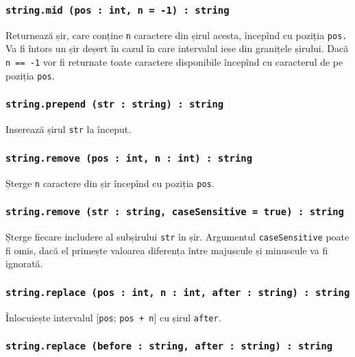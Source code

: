 \subsubsection{\texttt{string.mid (pos : int, n = -1) : string}}

Returnează șir, care conține \texttt{n} caractere din șirul acesta, începînd cu poziția \texttt{pos.} Va fi întors un șir deșert în cazul în care intervalul iese din granițele șirului. Dacă \texttt{n == -1} vor fi returnate toate caractere disponibile începînd cu caracterul de pe poziția \texttt{pos}.

\subsubsection{\texttt{string.prepend (str : string) : string}}

Inserează șirul \texttt{str} la început.

\subsubsection{\texttt{string.remove (pos : int, n : int) : string}}

Șterge \texttt{n} caractere din șir începînd cu poziția \texttt{pos}.

\subsubsection{\texttt{string.remove (str : string, caseSensitive = true) : string}}

Șterge fiecare includere al subșirului \texttt{str} în șir. Argumentul \texttt{caseSensitive} poate fi omis, dacă el primește valoarea \false{} diferența între majuscule și minuscule va fi ignorată.

\subsubsection{\texttt{string.replace (pos : int, n : int, after : string) : string}}

Înlocuiește intervalul [\texttt{pos}; \texttt{pos + n}] cu șirul \texttt{after}.

\subsubsection{\texttt{string.replace (before : string, after : string) : string}}

